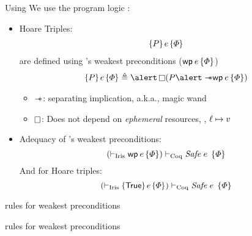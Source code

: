 \documentclass{beamer}
\begin{document}
\begin{frame}[t]{Using \Iris{}}
  We use the program logic \Iris{} :
  \begin{itemize}
  \item Hoare Triples:
    \begin{align*}
      \hoare{\prop}{\expr}{\pred}
    \end{align*}
    are defined using \Iris{}'s weakest preconditions ($\wpre{\expr}{\pred}$)
    \begin{align*}
      \hoare{\prop}{\expr}{\pred} \eqdef{} {\alert \always} (\prop {\alert \wand} \wpre{\expr}{\pred})
    \end{align*}
    \begin{itemize}
      \item $\mathrel{-\!\!*}$: separating implication, a.k.a., magic wand
      \item $\mathop{\Box}$: Does not depend on \emph{ephemeral} resources, \eg, $\ell \mapsto v$
    \end{itemize}
  \item Adequacy of \Iris{}'s weakest preconditions:
    \[ (\proves_{\mathrm{Iris}} \wpre{\expr}{\pred})  \proves_{\mathrm{Coq}} \SAFE{\expr}{\pred}\]
    And for Hoare triples:
    \[ (\proves_{\mathrm{Iris}} \hoare{\TRUE}{\expr}{\pred})  \proves_{\mathrm{Coq}} \SAFE{\expr}{\pred}\]
  \end{itemize}
\end{frame}

\begin{frame}[t]{\Iris{} rules for weakest preconditions}
\end{frame}

\begin{frame}[t]{\Iris{} rules for weakest preconditions}
\end{frame}
\end{document}
